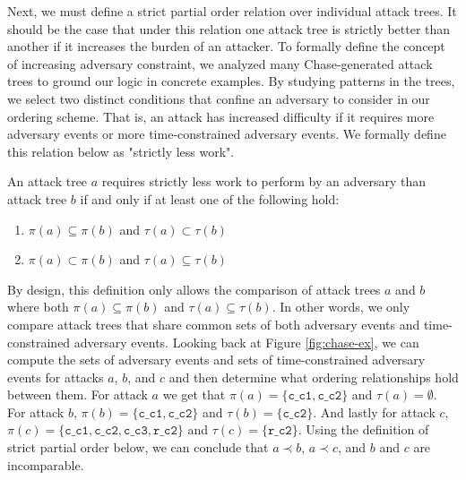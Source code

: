 \documentclass[runningheads]{llncs}
\theoremstyle{definition}
\newcommand{\squash}{\itemsep=0pt\parskip=0pt}
\begin{document}
Next, we must define a strict partial order relation over individual attack trees. It should be the case that under this relation one attack tree is strictly better than another if it increases the burden of an attacker. To formally define the concept of increasing adversary constraint, we analyzed many Chase-generated attack trees to ground our logic in concrete examples. By studying patterns in the trees, we select two distinct conditions that confine an adversary to consider in our ordering scheme. That is, an attack has increased difficulty if it requires more adversary events or more time-constrained adversary events. We formally define this relation below as "strictly less work".

\begin{definition}
  An attack tree $a$ requires strictly less work to perform by an adversary than attack tree $b$ if and only if at least one of the following hold: 
\begin{enumerate}
  \squash
  \item $\pi(a) \subseteq \pi(b)$ and $\tau(a) \subset \tau(b)$
  \item $\pi(a) \subset \pi(b)$ and $\tau(a) \subseteq \tau(b)$
\end{enumerate}
\end{definition}

\noindent By design, this definition only allows the comparison of attack trees $a$ and $b$ where both $\pi(a) \subseteq \pi(b)$ and $\tau(a) \subseteq \tau(b)$. In other words, we only compare attack trees that share common sets of both adversary events and time-constrained adversary events. Looking back at Figure \ref{fig:chase-ex}, we can compute the sets of adversary events and sets of time-constrained adversary events for attacks $a$, $b$, and $c$ and then determine what ordering relationships hold between them. For attack $a$ we get that $\pi(a) = \{ \texttt{c\_c1}, \texttt{c\_c2} \}$ and $\tau(a) = \emptyset$. For attack $b$, $\pi(b) = \{ \texttt{c\_c1}, \texttt{c\_c2} \}$ and $\tau(b) = \{ \texttt{c\_c2} \}$. And lastly for attack $c$, $\pi(c) = \{ \texttt{c\_c1}, \texttt{c\_c2}, \texttt{c\_c3}, \texttt{r\_c2} \}$ and $\tau(c) = \{ \texttt{r\_c2} \}$. Using the definition of strict partial order below, we can conclude that $a \prec b$, $a \prec c$, and $b$ and $c$ are incomparable.
\end{document}
